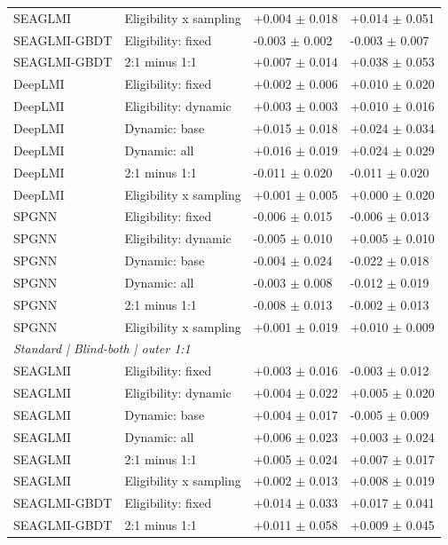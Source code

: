 {\begin{longtable}{llll}
SEAGLMI & Eligibility x sampling & +0.004 $\pm$ 0.018 & +0.014 $\pm$ 0.051 \\
SEAGLMI-GBDT & Eligibility: fixed & -0.003 $\pm$ 0.002 & -0.003 $\pm$ 0.007 \\
SEAGLMI-GBDT & 2:1 minus 1:1 & +0.007 $\pm$ 0.014 & +0.038 $\pm$ 0.053 \\
DeepLMI & Eligibility: fixed & +0.002 $\pm$ 0.006 & +0.010 $\pm$ 0.020 \\
DeepLMI & Eligibility: dynamic & +0.003 $\pm$ 0.003 & +0.010 $\pm$ 0.016 \\
DeepLMI & Dynamic: base & +0.015 $\pm$ 0.018 & +0.024 $\pm$ 0.034 \\
DeepLMI & Dynamic: all & +0.016 $\pm$ 0.019 & +0.024 $\pm$ 0.029 \\
DeepLMI & 2:1 minus 1:1 & -0.011 $\pm$ 0.020 & -0.011 $\pm$ 0.020 \\
DeepLMI & Eligibility x sampling & +0.001 $\pm$ 0.005 & +0.000 $\pm$ 0.020 \\
SPGNN & Eligibility: fixed & -0.006 $\pm$ 0.015 & -0.006 $\pm$ 0.013 \\
SPGNN & Eligibility: dynamic & -0.005 $\pm$ 0.010 & +0.005 $\pm$ 0.010 \\
SPGNN & Dynamic: base & -0.004 $\pm$ 0.024 & -0.022 $\pm$ 0.018 \\
SPGNN & Dynamic: all & -0.003 $\pm$ 0.008 & -0.012 $\pm$ 0.019 \\
SPGNN & 2:1 minus 1:1 & -0.008 $\pm$ 0.013 & -0.002 $\pm$ 0.013 \\
SPGNN & Eligibility x sampling & +0.001 $\pm$ 0.019 & +0.010 $\pm$ 0.009 \\
\multicolumn{4}{l}{\textit{Standard | Blind-both | outer 1:1}}\\
SEAGLMI & Eligibility: fixed & +0.003 $\pm$ 0.016 & -0.003 $\pm$ 0.012 \\
SEAGLMI & Eligibility: dynamic & +0.004 $\pm$ 0.022 & +0.005 $\pm$ 0.020 \\
SEAGLMI & Dynamic: base & +0.004 $\pm$ 0.017 & -0.005 $\pm$ 0.009 \\
SEAGLMI & Dynamic: all & +0.006 $\pm$ 0.023 & +0.003 $\pm$ 0.024 \\
SEAGLMI & 2:1 minus 1:1 & +0.005 $\pm$ 0.024 & +0.007 $\pm$ 0.017 \\
SEAGLMI & Eligibility x sampling & +0.002 $\pm$ 0.013 & +0.008 $\pm$ 0.019 \\
SEAGLMI-GBDT & Eligibility: fixed & +0.014 $\pm$ 0.033 & +0.017 $\pm$ 0.041 \\
SEAGLMI-GBDT & 2:1 minus 1:1 & +0.011 $\pm$ 0.058 & +0.009 $\pm$ 0.045 \\

\end{longtable}}
